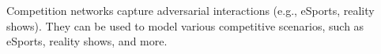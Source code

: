 \documentclass[preview]{standalone}
\begin{document}
Competition networks capture adversarial interactions (e.g., eSports, reality shows). They can be used to model various competitive scenarios, such as eSports, reality shows, and more.\\
\end{document}
